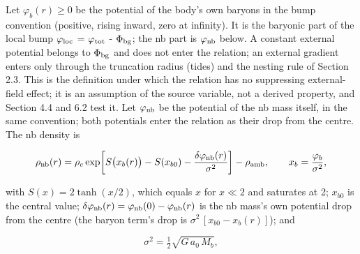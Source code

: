 \documentclass[
  10pt,
]{article}
\begin{document}
Let $\varphi_b(r)\ge 0$ be the potential of the body's own baryons
in the bump convention (positive, rising inward, zero at infinity). It is
the baryonic part of the local bump
$\varphi_{\rm loc}$ = $\varphi_{\rm tot}$ - $\Phi_{\rm bg}$; the nb part is $\varphi_{\rm nb}$ below. A constant external potential belongs to
$\Phi_{\rm bg}$ and does not enter the relation; an external gradient enters only
through the truncation radius (tides) and the nesting rule of Section
2.3. This is the definition under which the relation has no suppressing
external-field effect; it is an assumption of the source variable, not a
derived property, and Section 4.4 and 6.2 test it. Let $\varphi_{\rm nb}$ be the
potential of the nb mass itself, in the same convention; both potentials
enter the relation as their drop from the centre. The nb density is

\begin{equation}
\rho_{\rm nb}(r)=\rho_c\exp\!\left[S\big(x_b(r)\big)-S(x_{b0})-\frac{\delta\varphi_{\rm nb}(r)}{\sigma^2}\right]-\rho_{\rm amb},\qquad x_b=\frac{\varphi_b}{\sigma^2},
\end{equation}

with $S(x)=2\tanh(x/2)$, which equals $x$ for $x\ll 2$ and
saturates at 2; $x_{b0}$ is the central value; $\delta\varphi_{\rm nb}(r)=\varphi_{\rm nb}(0)-\varphi_{\rm nb}(r)$ is the nb mass's own potential drop from the
centre (the baryon term's drop is $\sigma^2\,[x_{b0}-x_b(r)]$); and

\begin{equation}
\sigma^2=\tfrac12\sqrt{G\,a_0\,M_b},
\end{equation}
\end{document}
